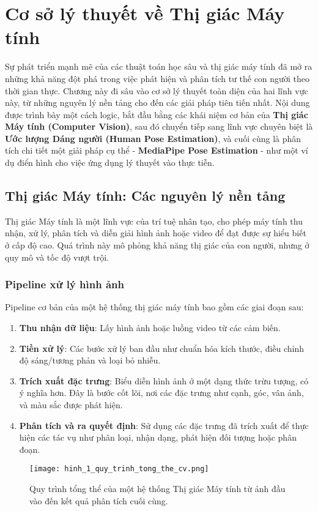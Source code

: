 \section{Cơ sở lý thuyết về Thị giác Máy tính}

Sự phát triển mạnh mẽ của các thuật toán học sâu và thị giác máy tính đã mở ra những khả năng đột phá trong việc phát hiện và phân tích tư thế con người theo thời gian thực. Chương này đi sâu vào cơ sở lý thuyết toàn diện của hai lĩnh vực này, từ những nguyên lý nền tảng cho đến các giải pháp tiên tiến nhất. Nội dung được trình bày một cách logic, bắt đầu bằng các khái niệm cơ bản của \textbf{Thị giác Máy tính (Computer Vision)}, sau đó chuyển tiếp sang lĩnh vực chuyên biệt là \textbf{Ước lượng Dáng người (Human Pose Estimation)}, và cuối cùng là phân tích chi tiết một giải pháp cụ thể - \textbf{MediaPipe Pose Estimation} - như một ví dụ điển hình cho việc ứng dụng lý thuyết vào thực tiễn.

\subsection{Thị giác Máy tính: Các nguyên lý nền tảng}

Thị giác Máy tính là một lĩnh vực của trí tuệ nhân tạo, cho phép máy tính thu nhận, xử lý, phân tích và diễn giải hình ảnh hoặc video để đạt được sự hiểu biết ở cấp độ cao. Quá trình này mô phỏng khả năng thị giác của con người, nhưng ở quy mô và tốc độ vượt trội.

\subsubsection{Pipeline xử lý hình ảnh}

Pipeline cơ bản của một hệ thống thị giác máy tính bao gồm các giai đoạn sau:
\begin{enumerate}
    \item \textbf{Thu nhận dữ liệu}: Lấy hình ảnh hoặc luồng video từ các cảm biến.
    \item \textbf{Tiền xử lý}: Các bước xử lý ban đầu như chuẩn hóa kích thước, điều chỉnh độ sáng/tương phản và loại bỏ nhiễu.
    \item \textbf{Trích xuất đặc trưng}: Biểu diễn hình ảnh ở một dạng thức trừu tượng, có ý nghĩa hơn. Đây là bước cốt lõi, nơi các đặc trưng như cạnh, góc, vân ảnh, và màu sắc được phát hiện.
    \item \textbf{Phân tích và ra quyết định}: Sử dụng các đặc trưng đã trích xuất để thực hiện các tác vụ như phân loại, nhận dạng, phát hiện đối tượng hoặc phân đoạn.
\end{enumerate}
\begin{figure}[h]
    \centering
    \texttt{[image: hinh\_1\_quy\_trinh\_tong\_the\_cv.png]}
    \caption{Quy trình tổng thể của một hệ thống Thị giác Máy tính từ ảnh đầu vào đến kết quả phân tích cuối cùng.}
    \label{fig:cv_pipeline}
\end{figure}

